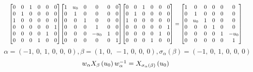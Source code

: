 \documentclass[11pt]{article}
\theoremstyle{definition}
\begin{document}
\[
\scaletoalign{\textwidth}{{\left[\begin{matrix}0 & 0 & 1 & 0 & 0 & 0\\0 & 1 & 0 & 0 & 0 & 0\\1 & 0 & 0 & 0 & 0 & 0\\0 & 0 & 0 & 0 & 0 & 1\\0 & 0 & 0 & 0 & 1 & 0\\0 & 0 & 0 & 1 & 0 & 0\end{matrix}\right]} {\left[\begin{matrix}1 & u_{0} & 0 & 0 & 0 & 0\\0 & 1 & 0 & 0 & 0 & 0\\0 & 0 & 1 & 0 & 0 & 0\\0 & 0 & 0 & 1 & 0 & 0\\0 & 0 & 0 & - u_{0} & 1 & 0\\0 & 0 & 0 & 0 & 0 & 1\end{matrix}\right]} {\left[\begin{matrix}0 & 0 & 1 & 0 & 0 & 0\\0 & 1 & 0 & 0 & 0 & 0\\1 & 0 & 0 & 0 & 0 & 0\\0 & 0 & 0 & 0 & 0 & 1\\0 & 0 & 0 & 0 & 1 & 0\\0 & 0 & 0 & 1 & 0 & 0\end{matrix}\right]} = {\left[\begin{matrix}1 & 0 & 0 & 0 & 0 & 0\\0 & 1 & 0 & 0 & 0 & 0\\0 & u_{0} & 1 & 0 & 0 & 0\\0 & 0 & 0 & 1 & 0 & 0\\0 & 0 & 0 & 0 & 1 & - u_{0}\\0 & 0 & 0 & 0 & 0 & 1\end{matrix}\right]}}
\]
\[
\alpha = \left( -1, \  0, \  1, \  0, \  0, \  0\right), \beta = \left( 1, \  0, \  -1, \  0, \  0, \  0\right), \sigma_{\alpha}(\beta) = \left( -1, \  0, \  1, \  0, \  0, \  0\right)
\]
\[
\scaletoalign{\textwidth}{w_{\alpha} X_{\beta}\left(u_{0}\right) w_{\alpha}^{-1} = X_{\sigma_{\alpha}\left(\beta\right)}\left(u_{0}\right)}
\]
\end{document}
